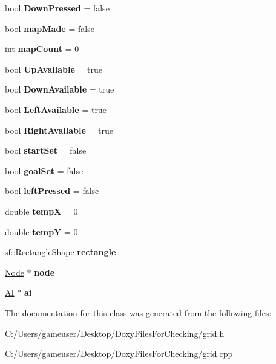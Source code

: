 \begin{DoxyCompactItemize}
bool {\bfseries Down\+Pressed} = false
\item 
\mbox{\label{class_grid_a2b0896bfef9ceb382855d64421cc23d2}} 
bool {\bfseries map\+Made} = false
\item 
\mbox{\label{class_grid_ace1fa4ec3c67080d58f8b5ed41e5acd3}} 
int {\bfseries map\+Count} = 0
\item 
\mbox{\label{class_grid_ac3c81729ef49f121e8c763612da73287}} 
bool {\bfseries Up\+Available} = true
\item 
\mbox{\label{class_grid_a0e5af8aadf13ebdd4510645632a63037}} 
bool {\bfseries Down\+Available} = true
\item 
\mbox{\label{class_grid_a675ffd9ad2e9b3b17f2bf6ee4e6fd1cc}} 
bool {\bfseries Left\+Available} = true
\item 
\mbox{\label{class_grid_a9801f7206613f4b670ca16cf30576820}} 
bool {\bfseries Right\+Available} = true
\item 
\mbox{\label{class_grid_a0c3f88355690745decb6ce33d8003396}} 
bool {\bfseries start\+Set} = false
\item 
\mbox{\label{class_grid_a8a9f76d78f951afeccf173c7ea2d59cb}} 
bool {\bfseries goal\+Set} = false
\item 
\mbox{\label{class_grid_a827f92f90e8970d5a71236c440e1f07c}} 
bool {\bfseries left\+Pressed} = false
\item 
\mbox{\label{class_grid_a38d94c2a7258b8c49ee5472a28b9bbd9}} 
double {\bfseries tempX} = 0
\item 
\mbox{\label{class_grid_ab69f3d43617e635d3f8f529ce20ea70b}} 
double {\bfseries tempY} = 0
\item 
\mbox{\label{class_grid_a26208da3e976c5c02b3b6a15ef380959}} 
sf\+::\+Rectangle\+Shape {\bfseries rectangle}
\item 
\mbox{\label{class_grid_a7de99d6015c74405c66aea4df8a3ddfd}} 
\mbox{\hyperlink{class_node}{Node}} $\ast$ {\bfseries node}
\item 
\mbox{\label{class_grid_a832bcd92c2b22cd81efb7ddc6a865c61}} 
\mbox{\hyperlink{class_a_i}{AI}} $\ast$ {\bfseries ai}
\end{DoxyCompactItemize}


The documentation for this class was generated from the following files\+:\begin{DoxyCompactItemize}
\item 
C\+:/\+Users/gameuser/\+Desktop/\+Doxy\+Files\+For\+Checking/grid.\+h\item 
C\+:/\+Users/gameuser/\+Desktop/\+Doxy\+Files\+For\+Checking/grid.\+cpp\end{DoxyCompactItemize}
